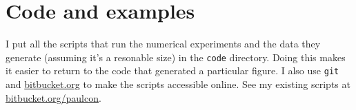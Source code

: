 \section{Code and examples}
\label{sec:examples}

\noindent I put all the scripts that run the numerical experiments and the data they generate (assuming it's a resonable size) in the \texttt{code} directory. Doing this makes it easier to return to the code that generated a particular figure. I also use \texttt{git} and \url{bitbucket.org} to make the scripts accessible online. See my existing scripts at \url{bitbucket.org/paulcon}. 
